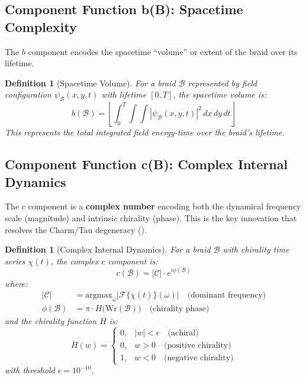\documentclass[11pt]{article}
\newtheorem{definition}[theorem]{Definition}
\theoremstyle{remark}
\begin{document}
\subsection{Component Function b(B): Spacetime Complexity}

The $b$ component encodes the spacetime ``volume'' or extent of the braid over its lifetime.

\begin{definition}[Spacetime Volume]
For a braid $\mathcal{B}$ represented by field configuration $\psi_{\mathcal{B}}(x,y,t)$ with lifetime $[0, T]$, the spacetime volume is:
\begin{equation}
b(\mathcal{B}) = \left\lfloor \int_0^T \int\int |\psi_{\mathcal{B}}(x,y,t)|^2 \, dx\,dy\,dt \right\rfloor
\end{equation}
This represents the total integrated field energy-time over the braid's lifetime.
\end{definition}

\subsection{Component Function c(B): Complex Internal Dynamics}

The $c$ component is a \textbf{complex number} encoding both the dynamical frequency scale (magnitude) and intrinsic chirality (phase). This is the key innovation that resolves the Charm/Tau degeneracy ().

\begin{definition}[Complex Internal Dynamics]
For a braid $\mathcal{B}$ with chirality time series $\chi(t)$, the complex $c$ component is:
\begin{equation}
c(\mathcal{B}) = |\mathcal{C}| \cdot e^{i\phi(\mathcal{B})}
\end{equation}
where:
\begin{align}
|\mathcal{C}| &= \text{argmax}_{\omega} \left|\mathcal{F}\{\chi(t)\}(\omega)\right| \quad \text{(dominant frequency)} \\
\phi(\mathcal{B}) &= \pi \cdot H\big(\text{Wr}(\mathcal{B})\big) \quad \text{(chirality phase)}
\end{align}
and the chirality function $H$ is:
\begin{equation}
H(w) = \begin{cases}
0, & |w| < \epsilon \quad \text{(achiral)} \\
0, & w > 0 \quad \text{(positive chirality)} \\
1, & w < 0 \quad \text{(negative chirality)}
\end{cases}
\end{equation}
with threshold $\epsilon = 10^{-10}$.
\end{definition}
\end{document}
